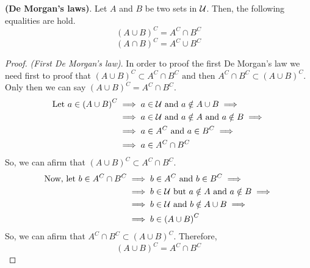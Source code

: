 \begin{proposition}
\textbf{(De Morgan's laws)}. Let $A$ and $B$ be two sets in $\mathcal{U}$. Then, the following equalities are hold.
\begin{equation}\label{demorgan:1}
    \left( A\cup B \right)^C = A^C\cap B^C
\end{equation}
\begin{equation}\label{demorgan:2}
    \left( A\cap B \right)^C = A^C\cup B^C 
\end{equation}
\end{proposition}
\begin{proof}
    \textit{(First De Morgan's law)}. In order to proof the first De Morgan's law we need first to proof that $\left( A\cup B \right)^C\subset A^C\cap B^C \textrm{ and then } A^C\cap B^C \subset \left(  A\cup B\right)^C$. Only then we can say $\left( A\cup B \right)^C = A^C\cap B^C $. 
    \begin{align}
        \textrm{Let } a\in\left( A\cup B \right)^C &\implies a\in\mathcal{U}\textrm{ and } a\notin A\cup B \implies \\
                                     &\implies a\in\mathcal{U}\textrm{ and } a\notin A\textrm{ and } a\notin B \implies \\ &\implies a\in A^C\textrm{ and } a\in B^C \implies \\
                                                         &\implies a\in A^C\cap B^C
    \end{align}
    So, we can afirm that $\left( A\cup B \right)^C \subset A^C\cap B^C $.
    \begin{align}
        \textrm{Now, let } b\in A^C\cap B^C &\implies b\in A^C\textrm{ and } b\in B^C \implies \\
                                            &\implies b\in\mathcal{U}\textrm{ but } a\notin A\textrm{ and } a\notin B \implies \\ &\implies b\in\mathcal{U}\textrm{ and } b\notin A\cup B \implies \\
                                            &\implies b\in \left( A\cup B \right)^C
    \end{align}
    So, we can afirm that $A^C\cap B^C\subset\left( A\cup B \right)^C $. Therefore,
    \begin{equation}
        \left( A\cup B \right)^C = A^C\cap B^C
    \end{equation}

\end{proof}

